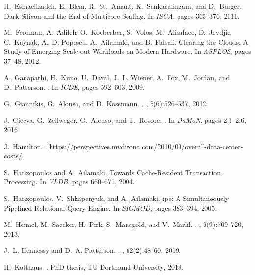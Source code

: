 \documentclass[11pt,dvipdfm]{article}
\begin{document}
\begin{thebibliography}{10}
\begin{small}
H.~Esmaeilzadeh, E.~Blem, R.~St.~Amant, K.~Sankaralingam, and D.~Burger.
\newblock Dark {S}ilicon and the {E}nd of {M}ulticore {S}caling.
\newblock In {\em ISCA}, pages 365--376, 2011.

M.~Ferdman, A.~Adileh, O.~Kocberber, S.~Volos, M.~Alisafaee, D.~Jevdjic,
  C.~Kaynak, A.~D. Popescu, A.~Ailamaki, and B.~Falsafi.
\newblock Clearing the {C}louds: {A} {S}tudy of {E}merging {S}cale-out
  {W}orkloads on {M}odern {H}ardware.
\newblock In {\em ASPLOS}, pages 37--48, 2012.

A.~{Ganapathi}, H.~{Kuno}, U.~{Dayal}, J.~L. {Wiener}, A.~{Fox}, M.~{Jordan},
  and D.~{Patterson}.
.
\newblock In {\em ICDE}, pages 592--603, 2009.

G.~Giannikis, G.~Alonso, and D.~Kossmann.
.
, 5(6):526--537, 2012.

J.~Giceva, G.~Zellweger, G.~Alonso, and T.~Roscoe.
.
\newblock In {\em DaMoN}, pages 2:1--2:6, 2016.

J.~Hamilton.
.
\newblock
  \url{https://perspectives.mvdirona.com/2010/09/overall-data-center-costs/}.

S.~Harizopoulos and A.~Ailamaki.
 {T}owards {C}ache-{R}esident {T}ransaction {P}rocessing.
\newblock In {\em VLDB}, pages 660--671, 2004.

S.~Harizopoulos, V.~Shkapenyuk, and A.~Ailamaki.
ipe: {A} {S}imultaneously {P}ipelined {R}elational {Q}uery
  {E}ngine.
\newblock In {\em SIGMOD}, pages 383--394, 2005.

M.~Heimel, M.~Saecker, H.~Pirk, S.~Manegold, and V.~Markl.
.
, 6(9):709--720, 2013.

J.~L. Hennessy and D.~A. Patterson.
.
, 62(2):48--60, 2019.

H.~Kotthaus.
.
\newblock PhD thesis, TU Dortmund University, 2018.


\end{small}
\end{thebibliography}
\end{document}
